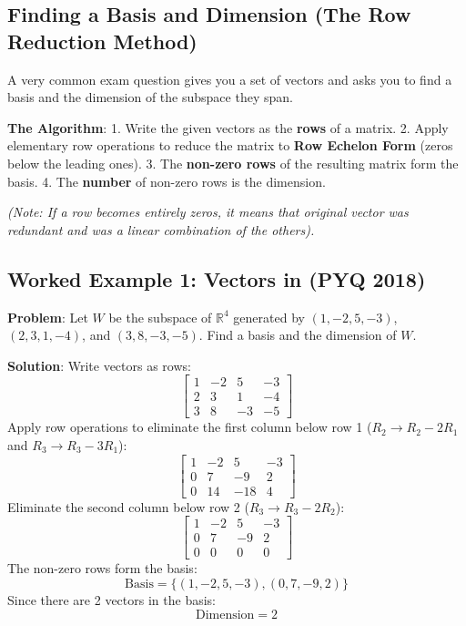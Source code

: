 \documentclass[
]{article}
\begin{document}
\subsection{Finding a Basis and Dimension (The Row Reduction
Method)}\label{finding-a-basis-and-dimension-the-row-reduction-method}

A very common exam question gives you a set of vectors and asks you to
find a basis and the dimension of the subspace they span.

\textbf{The Algorithm}: 1. Write the given vectors as the \textbf{rows}
of a matrix. 2. Apply elementary row operations to reduce the matrix to
\textbf{Row Echelon Form} (zeros below the leading ones). 3. The
\textbf{non-zero rows} of the resulting matrix form the basis. 4. The
\textbf{number} of non-zero rows is the dimension.

\emph{(Note: If a row becomes entirely zeros, it means that original
vector was redundant and was a linear combination of the others).}

\subsection{Worked Example 1: Vectors in (PYQ
2018)}\label{worked-example-1-vectors-in-pyq-2018}

\textbf{Problem}: Let \(W\) be the subspace of \(\mathbb{R}^4\)
generated by \((1, -2, 5, -3)\), \((2, 3, 1, -4)\), and
\((3, 8, -3, -5)\). Find a basis and the dimension of \(W\).

\textbf{Solution}: Write vectors as rows:
\[
\begin{bmatrix}
1 & -2 & 5 & -3 \\
2 & 3 & 1 & -4 \\
3 & 8 & -3 & -5
\end{bmatrix}
\]
Apply row operations to eliminate the first column below row 1
(\(R_2 \to R_2 - 2R_1\) and \(R_3 \to R_3 - 3R_1\)):
\[
\begin{bmatrix}
1 & -2 & 5 & -3 \\
0 & 7 & -9 & 2 \\
0 & 14 & -18 & 4
\end{bmatrix}
\]
Eliminate the second column below row 2 (\(R_3 \to R_3 - 2R_2\)):
\[
\begin{bmatrix}
1 & -2 & 5 & -3 \\
0 & 7 & -9 & 2 \\
0 & 0 & 0 & 0
\end{bmatrix}
\]
The non-zero rows form the basis:
\[
\text{Basis} = \lbrace (1, -2, 5, -3), (0, 7, -9, 2) \rbrace
\]
Since there are 2 vectors in the basis:
\[
\text{Dimension} = 2
\]
\end{document}
